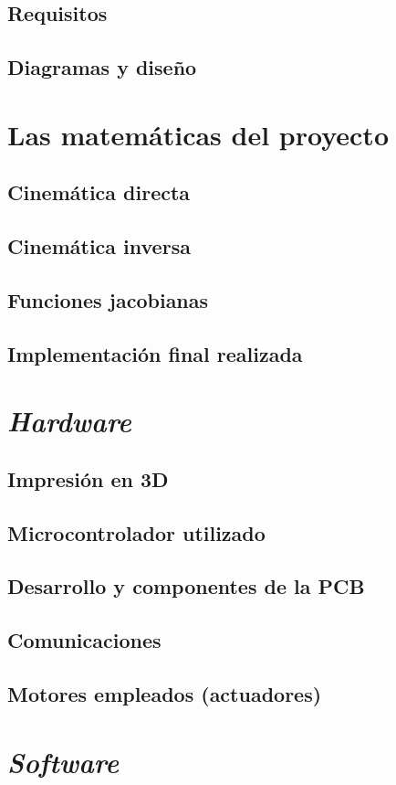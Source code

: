 \section{Requisitos}
\section{Diagramas y diseño}
\chapter{Las matemáticas del proyecto}
\section{Cinemática directa}
\section{Cinemática inversa}
\section{Funciones jacobianas}
\section{Implementación final realizada}
\chapter{\textit{Hardware}}
\section{Impresión en 3D}
\section{Microcontrolador utilizado}
\section{Desarrollo y componentes de la PCB}
\section{Comunicaciones}
\section{Motores empleados (actuadores)}
\chapter{\textit{Software}}

